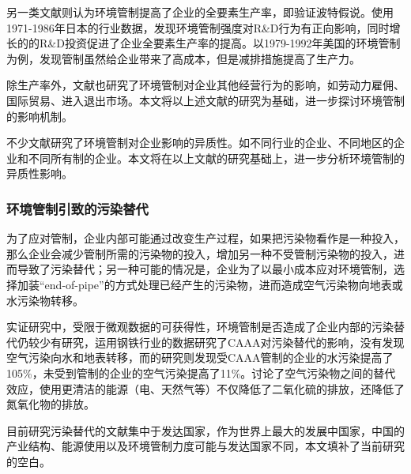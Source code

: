 \documentclass{ctexart}
\begin{document}
另一类文献则认为环境管制提高了企业的全要素生产率，即验证波特假说。\textcite{hamamoto2006environmental}使用1971-1986年日本的行业数据，发现环境管制强度对R\&D行为有正向影响，同时增长的的R\&D投资促进了企业全要素生产率的提高。\textcite{berman2001environmental}以1979-1992年美国的环境管制为例，发现管制虽然给企业带来了高成本，但是减排措施提高了生产力。

除生产率外，文献也研究了环境管制对企业其他经营行为的影响，如劳动力雇佣\cite{berman2001_2,walker2011environmental}、国际贸易\cite{levinson2008unmasking,aichele2015kyoto,hanna2010us}、进入退出市场\cite{deily1991enforcement,wang2018environmental,he2002urban,盛丹2019两控区环境管制与企业全要素生产率增长}。本文将以上述文献的研究为基础，进一步探讨环境管制的影响机制。

不少文献研究了环境管制对企业影响的异质性。如不同行业的企业\cite{李树2013环境管制与生产率增长,he2020watering}、不同地区的企业\cite{王兵2010中国区域环境效率与环境全要素生产率增长,李虹2018环境规制}和不同所有制的企业\cite{沈坤荣2017环境规制引起了污染就近转移吗,杜龙政2019环境规制}。本文将在以上文献的研究基础上，进一步分析环境管制的异质性影响。


\subsubsection{环境管制引致的污染替代}
为了应对管制，企业内部可能通过改变生产过程，如果把污染物看作是一种投入，那么企业会减少管制所需的污染物的投入，增加另一种不受管制污染物的投入，进而导致了污染替代\cite{gibson2019regulation,holland2011spillovers}；另一种可能的情况是，企业为了以最小成本应对环境管制，选择加装``end-of-pipe''的方式处理已经产生的污染物，进而造成空气污染物向地表或水污染物转移\cite{greenstone2003estimating}。

实证研究中，受限于微观数据的可获得性，环境管制是否造成了企业内部的污染替代仍较少有研究，\textcite{greenstone2003estimating}运用钢铁行业的数据研究了CAAA对污染替代的影响，没有发现空气污染向水和地表转移，而\textcite{gibson2019regulation}的研究则发现受CAAA管制的企业的水污染提高了105\%，未受到管制的企业的空气污染提高了11\%。\textcite{holland2011spillovers}讨论了空气污染物之间的替代效应，使用更清洁的能源（电、天然气等）不仅降低了二氧化硫的排放，还降低了氮氧化物的排放。

目前研究污染替代的文献集中于发达国家，作为世界上最大的发展中国家，中国的产业结构、能源使用以及环境管制力度可能与发达国家不同，本文填补了当前研究的空白。

	\FloatBarrier
	\newpage
    \printbibliography[heading=bibliography,title=参考文献]
	
\end{document}
